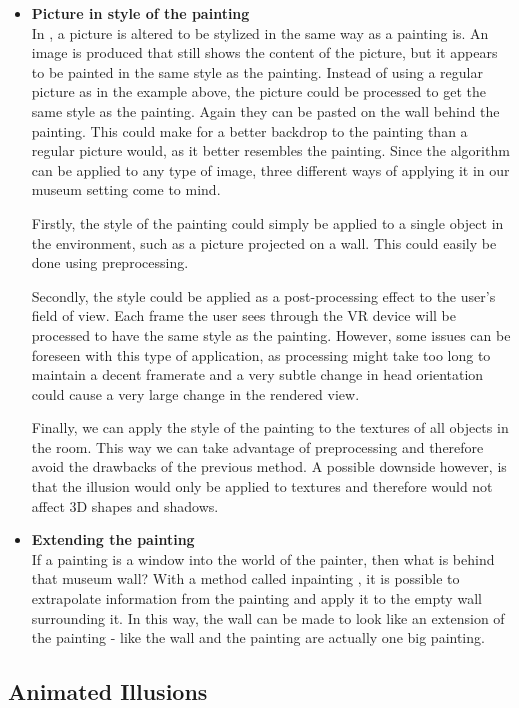 \documentclass[a4paper]{article}
\begin{document}
\begin{itemize}
\item{\textbf{Picture in style of the painting}}
\\In \cite{gatys}, a picture is altered to be stylized in the same way as a painting is. An image is produced that still shows the content of the picture, but it appears to be painted in the same style as the painting. Instead of using a regular picture as in the example above, the picture could be processed to get the same style as the painting. Again they can be pasted on the wall behind the painting. This could make for a better backdrop to the painting than a regular picture would, as it better resembles the painting. Since the algorithm can be applied to any type of image, three different ways of applying it in our museum setting come to mind. 

Firstly, the style of the painting could simply be applied to a single object in the environment, such as a picture projected on a wall. This could easily be done using preprocessing. 

Secondly, the style could be applied as a post-processing effect to the user's field of view. Each frame the user sees through the VR device will be processed to have the same style as the painting. However, some issues can be foreseen with this type of application, as processing might take too long to maintain a decent framerate and a very subtle change in head orientation could cause a very large change in the rendered view. 

Finally, we can apply the style of the painting to the textures of all objects in the room. This way we can take advantage of preprocessing and therefore avoid the drawbacks of the previous method. A possible downside however, is that the illusion would only be applied to textures and therefore would not affect 3D shapes and shadows.

\item{\textbf{Extending the painting}}
\\If a painting is a window into the world of the painter, then what is behind that museum wall? With a method called inpainting \cite{inpainting}, it is possible to extrapolate information from the painting and apply it to the empty wall surrounding it. In this way, the wall can be made to look like an extension of the painting - like the wall and the painting are actually one big painting.

\end{itemize}

\subsection{Animated Illusions}\label{sec:animeffects}
\end{document}
